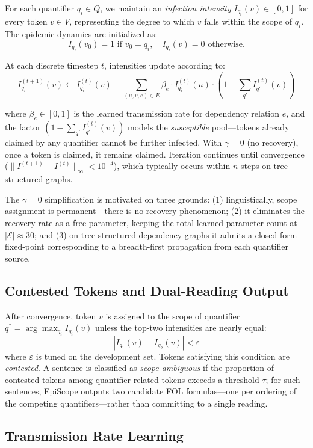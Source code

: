 \documentclass[11pt,letterpaper]{article}
\begin{document}
For each quantifier $q_i \in Q$, we maintain an \emph{infection intensity} $I_{q_i}(v) \in [0,1]$ for every
token $v \in V$, representing the degree to which $v$ falls within the scope of $q_i$. The epidemic dynamics
are initialized as:
\[
I_{q_i}(v_0) = 1 \text{ if } v_0 = q_i, \quad I_{q_i}(v) = 0 \text{ otherwise.}
\]

At each discrete timestep $t$, intensities update according to:
\[
I_{q_i}^{(t+1)}(v) \leftarrow I_{q_i}^{(t)}(v) + \sum_{(u,v,e) \in E} \beta_e \cdot I_{q_i}^{(t)}(u) \cdot
\left(1 - \sum_{q'} I_{q'}^{(t)}(v)\right)
\]

where $\beta_e \in [0,1]$ is the learned transmission rate for dependency relation $e$, and the factor
$\left(1 - \sum_{q'} I_{q'}^{(t)}(v)\right)$ models the \emph{susceptible} pool---tokens already claimed by any
quantifier cannot be further infected. With $\gamma = 0$ (no recovery), once a token is claimed, it remains
claimed. Iteration continues until convergence ($\|I^{(t+1)} - I^{(t)}\|_\infty < 10^{-4}$), which typically
occurs within $n$ steps on tree-structured graphs.

The $\gamma = 0$ simplification is motivated on three grounds: (1) linguistically, scope assignment is
permanent---there is no recovery phenomenon; (2) it eliminates the recovery rate as a free parameter, keeping
the total learned parameter count at $|\mathcal{E}| \approx 30$; and (3) on tree-structured dependency graphs
it admits a closed-form fixed-point corresponding to a breadth-first propagation from each quantifier source.

\subsection{Contested Tokens and Dual-Reading Output}
\label{sec:contested}

After convergence, token $v$ is assigned to the scope of quantifier $q^* = \arg\max_{q_i} I_{q_i}(v)$ unless
the top-two intensities are nearly equal:
\[
|I_{q_1}(v) - I_{q_2}(v)| < \varepsilon
\]
where $\varepsilon$ is tuned on the development set. Tokens satisfying this condition are \emph{contested}.
A sentence is classified as \emph{scope-ambiguous} if the proportion of contested tokens among
quantifier-related tokens exceeds a threshold $\tau$; for such sentences, EpiScope outputs two candidate FOL
formulas---one per ordering of the competing quantifiers---rather than committing to a single reading.

\subsection{Transmission Rate Learning}
\end{document}
